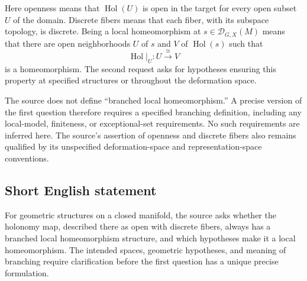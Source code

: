 \documentclass[11pt]{article}
\begin{document}
Here openness means that \(\operatorname{Hol}(U)\) is open in the target for every open subset \(U\) of the domain. Discrete fibers means that each fiber, with its subspace topology, is discrete. Being a local homeomorphism at \(s\in\mathcal D_{G,X}(M)\) means that there are open neighborhoods \(U\) of \(s\) and \(V\) of \(\operatorname{Hol}(s)\) such that
\[
\operatorname{Hol}|_U\colon U\xrightarrow{\ \cong\ }V
\]
is a homeomorphism. The second request asks for hypotheses ensuring this property at specified structures or throughout the deformation space.

The source does not define ``branched local homeomorphism.'' A precise version of the first question therefore requires a specified branching definition, including any local-model, finiteness, or exceptional-set requirements. No such requirements are inferred here. The source's assertion of openness and discrete fibers also remains qualified by its unspecified deformation-space and representation-space conventions.
\subsection{Short English statement}
For geometric structures on a closed manifold, the source asks whether the holonomy map, described there as open with discrete fibers, always has a branched local homeomorphism structure, and which hypotheses make it a local homeomorphism. The intended spaces, geometric hypotheses, and meaning of branching require clarification before the first question has a unique precise formulation.
\end{document}
